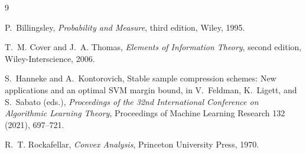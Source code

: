 \documentclass[11pt]{article}
\theoremstyle{definition}
\theoremstyle{remark}
\begin{document}
\begin{thebibliography}{9}

P.~Billingsley,
\newblock \emph{Probability and Measure}, third edition,
\newblock Wiley, 1995.

T.~M. Cover and J.~A. Thomas,
\newblock \emph{Elements of Information Theory}, second edition,
\newblock Wiley-Interscience, 2006.

S.~Hanneke and A.~Kontorovich,
\newblock Stable sample compression schemes: New applications and an optimal
SVM margin bound,
\newblock in V.~Feldman, K.~Ligett, and S.~Sabato (eds.),
\emph{Proceedings of the 32nd International Conference on Algorithmic
Learning Theory}, Proceedings of Machine Learning Research 132 (2021),
697--721.

R.~T. Rockafellar,
\newblock \emph{Convex Analysis},
\newblock Princeton University Press, 1970.

\end{thebibliography}
\end{document}
